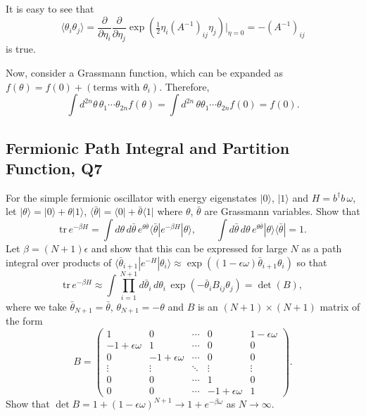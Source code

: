 \begin{solution}
   It is easy to see that
   \begin{equation}
       \langle \theta_i \theta_j \rangle = \frac{\partial}{\partial\eta_i}\frac{\partial}{\partial\eta_j}\exp\!\left(\tfrac{1}{2}\eta_i(A^{-1})_{ij}\eta_j\right)\bigg|_{\eta=0} = -(A^{-1})_{ij}
   \end{equation}
   is true.

   Now, consider a Grassmann function, which can be expanded as $f(\theta) = f(0) + (\text{terms with } \theta_i)$. Therefore, 
   \begin{equation}
       \int d^{2n}\theta\, \theta_1 \cdots \theta_{2n} f(\theta) = \int d^{2n}\,\theta\theta_1 \cdots \theta_{2n} f(0)  = f(0).
   \end{equation}
\end{solution}

\subsection{Fermionic Path Integral and Partition Function, Q7}

For the simple fermionic oscillator with energy eigenstates $|0\rangle$, $|1\rangle$ and $H = b^\dagger b\,\omega$, let $|\theta\rangle = |0\rangle + \theta|1\rangle$, $\langle\bar\theta| = \langle 0| + \bar\theta\langle 1|$ where $\theta$, $\bar\theta$ are Grassmann variables. Show that
\begin{equation}
    \mathrm{tr}\,e^{-\beta H} = \int d\theta\,d\bar\theta\,e^{\theta\bar\theta}\langle\bar\theta|e^{-\beta H}|\theta\rangle, \qquad \int d\bar\theta\,d\theta\,e^{\theta\bar\theta}|\theta\rangle\langle\bar\theta| = 1.
\end{equation}
Let $\beta = (N+1)\epsilon$ and show that this can be expressed for large $N$ as a path integral over products of $\langle\bar\theta_{i+1}|e^{-H}|\theta_i\rangle \approx \exp\!\left((1-\epsilon\omega)\bar\theta_{i+1}\theta_i\right)$ so that
\begin{equation}
    \mathrm{tr}\,e^{-\beta H} \approx \int\prod_{i=1}^{N+1}d\bar\theta_i\,d\theta_i\,\exp\!\left(-\bar\theta_i B_{ij}\theta_j\right) = \det(B),
\end{equation}
where we take $\bar\theta_{N+1}=\bar\theta$, $\theta_{N+1}=-\theta$ and $B$ is an $(N+1)\times(N+1)$ matrix of the form
\begin{equation}
    B = \begin{pmatrix}
        1 & 0 & \cdots & 0 & 1-\epsilon\omega\\
        -1+\epsilon\omega & 1 & \cdots & 0 & 0\\
        0 & -1+\epsilon\omega & \cdots & 0 & 0\\
        \vdots & \vdots & \ddots & \vdots & \vdots\\
        0 & 0 & \cdots & 1 & 0\\
        0 & 0 & \cdots & -1+\epsilon\omega & 1
    \end{pmatrix}.
\end{equation}
Show that $\det B = 1 + (1-\epsilon\omega)^{N+1} \to 1 + e^{-\beta\omega}$ as $N\to\infty$.

